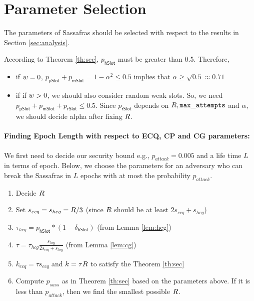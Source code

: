 \section{Parameter Selection}

The parameters of Sassafras should be selected with respect to the results in Section 
\ref{sec:analysis}.

According to Theorem \ref{th:sec}, $ p_\mathsf{hSlot} $ must be greater than 0.5. Therefore,
\begin{itemize}
	\item if $ w = 0 $, $ p_{\mathsf{pSlot}} + p_\mathsf{mSlot} = 1- \alpha^2  \leq 0.5 $ implies that $ \alpha \geq \sqrt{0.5} \approx 0.71  $
	
	\item if  if $ w > 0 $, we should also consider random weak slots. So, we need $ p_{\mathsf{pSlot}} + p_\mathsf{mSlot} + p_\mathsf{rSlot} \leq 0.5$. Since $ p_\mathsf{rSlot} $ depends on $ R , \mathtt{max\_attempts} $ and $ \alpha $, we should decide alpha after fixing $ R  $. 
\end{itemize}


\paragraph{Finding Epoch Length with respect to ECQ, CP and CG parameters:}

We first need to decide our security bound e.g., $ p_{attack} = 0.005 $ and a life time $ L $ in terms of epoch. Below, we choose the parameters for an adversary who can break the Sassafras in $ L $ epochs with at most the probability $ p_{attack} $.	

\begin{enumerate}
	\item Decide $ R $
	\item Set $ s_{ecq} = s_{hcg}  = R /3 $ (since $ R  $ should be at least $ 2s_{ecq} + s_{hcg} $)
	\item $ \tau_{hcg} = p_{\mathsf{hSlot}} * (1 - \delta_{\mathsf{hSlot}}) $ (from Lemma \ref{lem:hcg})
	\item $ \tau = \tau_{hcg} \frac{s_{hcg}}{2s_{ecq} + s_{hcg}} $ (from Lemma \ref{lem:cg})
	\item $ k_{ecq} = \tau s_{ecq}  $ and $ k = \tau R  $ to satisfy the Theorem \ref{th:sec}
	\item Compute $ p_{sass} $ as in Theorem \ref{th:sec} based on the parameters above. If it is less than $ p_{attack} $, then we find the smallest possible $ R $.
\end{enumerate}

